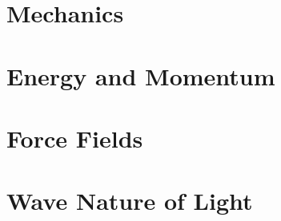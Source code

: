 \documentclass[
  12pt, %
  letterpaper,
]{LegrandOrangeBook}
\begin{document}



\part{Mechanics}






%




\part{Energy and Momentum}










%

\part{Force Fields}










\part{Wave Nature of Light}





\end{document}

